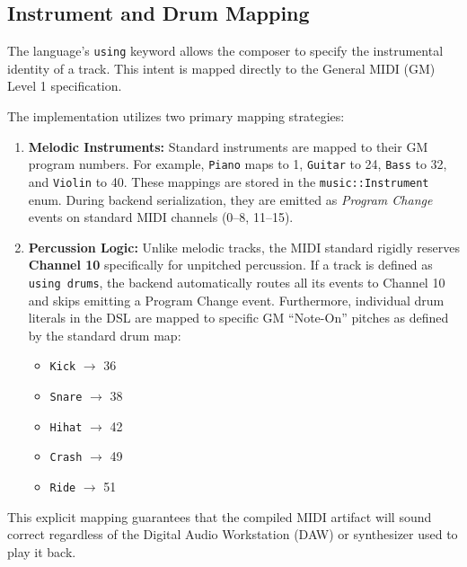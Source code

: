 \subsection{Instrument and Drum Mapping}\label{subsec:instrument-and-drum-mapping}

The language's \texttt{using} keyword allows the composer to specify the instrumental identity of a track.
This intent is mapped directly to the General MIDI (GM) Level 1 specification.

The implementation utilizes two primary mapping strategies:
\begin{enumerate}
  \item \textbf{Melodic Instruments:} Standard instruments are mapped to their GM program numbers.
    For example, \texttt{Piano} maps to 1, \texttt{Guitar} to 24, \texttt{Bass} to 32, and \texttt{Violin} to 40.
    These mappings are stored in the \texttt{music::Instrument} enum.
    During backend serialization, they are emitted as \textit{Program Change} events on standard MIDI channels (0--8,
    11--15).
  \item \textbf{Percussion Logic:} Unlike melodic tracks, the MIDI standard rigidly reserves \textbf{Channel 10}
    specifically for unpitched percussion.
    If a track is defined as \texttt{using drums}, the backend automatically routes all its events to Channel 10 and
    skips emitting a Program Change event.
    Furthermore, individual drum literals in the DSL are mapped to specific GM ``Note-On'' pitches as defined by the
    standard drum map:
    \begin{itemize}
      \item \texttt{Kick} $\rightarrow$ 36
      \item \texttt{Snare} $\rightarrow$ 38
      \item \texttt{Hihat} $\rightarrow$ 42
      \item \texttt{Crash} $\rightarrow$ 49
      \item \texttt{Ride} $\rightarrow$ 51
    \end{itemize}
\end{enumerate}
This explicit mapping guarantees that the compiled MIDI artifact will sound correct regardless of the Digital Audio
Workstation (DAW) or synthesizer used to play it back.
